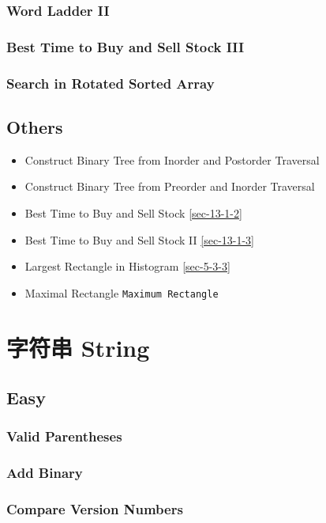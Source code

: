 \documentclass[12pt]{book}
\begin{document}
\subsection{Word Ladder II}
\label{sec-1-3-9}
\subsection{Best Time to Buy and Sell Stock III}
\label{sec-1-3-10}
\subsection{Search in Rotated Sorted Array}
\label{sec-1-3-11}
\section{Others}
\label{sec-1-4}
\begin{itemize}
\item Construct Binary Tree from Inorder and Postorder Traversal
\item Construct Binary Tree from Preorder and Inorder Traversal
\item Best Time to Buy and Sell Stock
\ref{sec-13-1-2}
\item Best Time to Buy and Sell Stock II        
\ref{sec-13-1-3}
\item Largest Rectangle in Histogram
\ref{sec-5-3-3}
\item Maximal Rectangle
\texttt{Maximum Rectangle}
\end{itemize}

\chapter{字符串 String}
\label{sec-2}
\section{Easy}
\label{sec-2-1}
\subsection{Valid Parentheses}
\label{sec-2-1-1}
\subsection{Add Binary}
\label{sec-2-1-2}
\subsection{Compare Version Numbers}
\label{sec-2-1-3}
\end{document}
